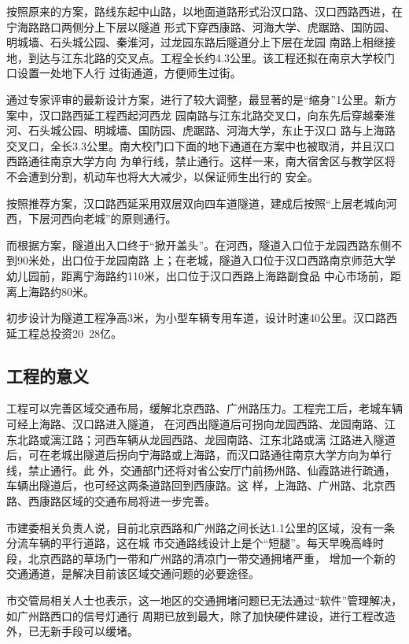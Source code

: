 ﻿\documentclass[11pt,a4paper,onecolumn]{article}
\begin{document}
按照原来的方案，路线东起中山路，以地面道路形式沿汉口路、汉口西路西进，在宁海路路口两侧分上下层以隧道
形式下穿西康路、河海大学、虎踞路、国防园、明城墙、石头城公园、秦淮河，过龙园东路后隧道分上下层在龙园
南路上相继接地，到达与江东北路的交叉点。工程全长约4.3公里。该工程还拟在南京大学校门口设置一处地下人行
过街通道，方便师生过街。

通过专家评审的最新设计方案，进行了较大调整，最显著的是“缩身”1公里。新方案中，汉口路西延工程西起河西龙
园南路与江东北路交叉口，向东先后穿越秦淮河、石头城公园、明城墙、国防园、虎踞路、河海大学，东止于汉口
路与上海路交叉口，全长3.3公里。南大校门口下面的地下通道在方案中也被取消，并且汉口西路通往南京大学方向
为单行线，禁止通行。这样一来，南大宿舍区与教学区将不会遭到分割，机动车也将大大减少，以保证师生出行的
安全。

按照推荐方案，汉口路西延采用双层双向四车道隧道，建成后按照“上层老城向河西，下层河西向老城”的原则通行。

而根据方案，隧道出入口终于“掀开盖头”。在河西，隧道入口位于龙园西路东侧不到90米处，出口位于龙园南路
上；在老城，隧道入口位于汉口西路南京师范大学幼儿园前，距离宁海路约110米，出口位于汉口西路上海路副食品
中心市场前，距离上海路约80米。

初步设计为隧道工程净高3米，为小型车辆专用车道，设计时速40公里。汉口路西延工程总投资20~28亿。

\subsection{工程的意义}

工程可以完善区域交通布局，缓解北京西路、广州路压力。工程完工后，老城车辆可经上海路、汉口路进入隧道，
在河西出隧道后可拐向龙园西路、龙园南路、江东北路或漓江路；河西车辆从龙园西路、龙园南路、江东北路或漓
江路进入隧道后，可在老城出隧道后拐向宁海路或上海路，而汉口路通往南京大学方向为单行线，禁止通行。此
外，交通部门还将对省公安厅门前扬州路、仙霞路进行疏通，车辆出隧道后，也可经这两条道路回到西康路。这
样，上海路、广州路、北京西路、西康路区域的交通布局将进一步完善。

市建委相关负责人说，目前北京西路和广州路之间长达1.1公里的区域，没有一条分流车辆的平行道路，这在城
市交通路线设计上是个“短腿”。每天早晚高峰时段，北京西路的草场门一带和广州路的清凉门一带交通拥堵严重，
增加一个新的交通通道，是解决目前该区域交通问题的必要途径。

市交管局相关人士也表示，这一地区的交通拥堵问题已无法通过“软件”管理解决，如广州路西口的信号灯通行
周期已放到最大，除了加快硬件建设，进行工程改造外，已无新手段可以缓堵。
\end{document}
